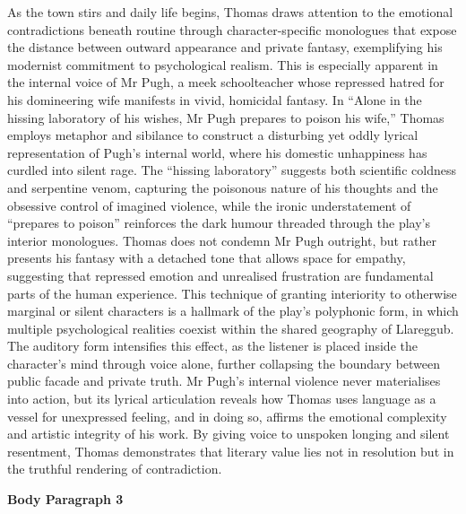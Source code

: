 		As the town stirs and daily life begins, Thomas draws attention to the emotional contradictions beneath routine through character-specific monologues that expose the distance between outward appearance and private fantasy, exemplifying his modernist commitment to psychological realism. This is especially apparent in the internal voice of Mr Pugh, a meek schoolteacher whose repressed hatred for his domineering wife manifests in vivid, homicidal fantasy. In “Alone in the hissing laboratory of his wishes, Mr Pugh prepares to poison his wife,” Thomas employs metaphor and sibilance to construct a disturbing yet oddly lyrical representation of Pugh’s internal world, where his domestic unhappiness has curdled into silent rage. The “hissing laboratory” suggests both scientific coldness and serpentine venom, capturing the poisonous nature of his thoughts and the obsessive control of imagined violence, while the ironic understatement of “prepares to poison” reinforces the dark humour threaded through the play’s interior monologues. Thomas does not condemn Mr Pugh outright, but rather presents his fantasy with a detached tone that allows space for empathy, suggesting that repressed emotion and unrealised frustration are fundamental parts of the human experience. This technique of granting interiority to otherwise marginal or silent characters is a hallmark of the play’s polyphonic form, in which multiple psychological realities coexist within the shared geography of Llareggub. The auditory form intensifies this effect, as the listener is placed inside the character’s mind through voice alone, further collapsing the boundary between public facade and private truth. Mr Pugh’s internal violence never materialises into action, but its lyrical articulation reveals how Thomas uses language as a vessel for unexpressed feeling, and in doing so, affirms the emotional complexity and artistic integrity of his work. By giving voice to unspoken longing and silent resentment, Thomas demonstrates that literary value lies not in resolution but in the truthful rendering of contradiction.

	\textbf{Body Paragraph 3}

